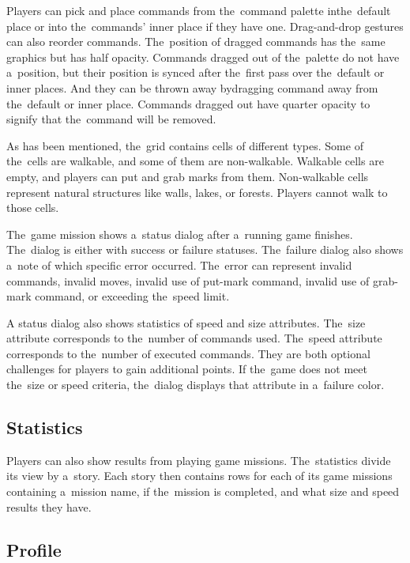 Players can pick and place commands from the~command palette in\linebreak{}the~default place or into the~commands' inner place if they have one.
\linebreak{}Drag-and-drop gestures can also reorder commands.
The~position of dragged commands has the~same graphics but has half opacity.
Commands dragged out of the~palette do not have a~position, but their position is synced after the~first pass over the~default or inner places.
And they can be thrown away by\linebreak{}dragging command away from the~default or inner place.
Commands dragged out have quarter opacity to signify that the~command will be removed.

As has been mentioned, the~grid contains cells of different types.
Some of the~cells are walkable, and some of them are non-walkable.
Walkable cells are empty, and players can put and grab marks from them.
Non-walkable cells represent natural structures like walls, lakes, or forests.
Players cannot walk to those cells.

The~game mission shows a~status dialog after a~running game finishes.
The~dialog is either with success or failure statuses.
The~failure dialog also shows a~note of which specific error occurred.
The~error can represent invalid commands, invalid moves, invalid use of put-mark command, invalid use of grab-mark command, or exceeding the~speed limit.

A status dialog also shows statistics of speed and size attributes.
The~size attribute corresponds to the~number of commands used.
The~speed attribute corresponds to the~number of executed commands.
They are both optional challenges for players to gain additional points.
If the~game does not meet the~size or speed criteria, the~dialog displays that attribute in a~failure color.

\subsection{Statistics}
\label{analysis:game:statistics}

Players can also show results from playing game missions.
The~statistics divide its view by a~story.
Each story then contains rows for each of its game missions containing a~mission name, if the~mission is completed, and what size and speed results they have.

\subsection{Profile}
\label{analysis:game:profile}

